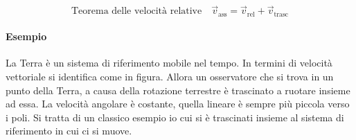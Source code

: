 \[
	\text{Teorema delle velocità relative} \quad \boxed{\vec{v}_{\text{ass}}=\vec{v}_{\text{rel}}+\vec{v}_{\text{trasc}}}
\]

\paragraph{Esempio} La Terra è un sistema di riferimento mobile nel tempo. In termini di velocità vettoriale si identifica come in figura. Allora un osservatore che si trova in un punto della Terra, a causa della rotazione terrestre è trascinato a ruotare insieme ad essa. La velocità angolare è costante, quella lineare è sempre più piccola verso i poli. Si tratta di un classico esempio io cui si è trascinati insieme al sistema di riferimento in cui ci si muove.

\begin{figure}[htpb]
	\centering


	\begin{tikzpicture}[x=0.75pt,y=0.75pt,yscale=-1,xscale=1]


\end{tikzpicture}
\end{figure}
